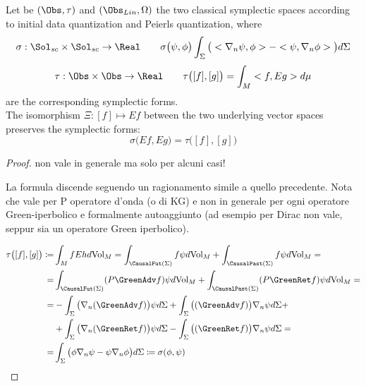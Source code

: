 \documentclass[Main]{subfiles}
\begin{document}
	\begin{proposition}
		Let be $(\Obs,\tau)$ and $(\Obs_{Lin},\Omega)$ the two classical symplectic spaces according to initial data quantization and Peierls quantization, where
		\begin{displaymath}
			\sigma: \Sol_{sc}\times \Sol_{sc} \rightarrow \Real \qquad 
			\sigma\big( \psi, \phi \big) \int_\Sigma \big( <\nabla_n \psi ,\phi>  - <\psi, \nabla_n \phi> \big) d\Sigma
		\end{displaymath}
		\begin{displaymath}
			\tau: \Obs \times \Obs \rightarrow \Real \qquad
			\tau \big( [f] ,[g] \big) = \int_M < f, Eg> d\mu
		\end{displaymath}
		are the corresponding symplectic forms.\\
		The isomorphism $\Xi: [f] \mapsto E f$ between the two underlying vector spaces preserves the symplectic forms:
		\begin{displaymath}
			\sigma \big( Ef, Eg \big) =  \tau\big( [f], [g] \big)
		\end{displaymath}
		
	
	\end{proposition}
	\begin{proof}
		\danger non vale in generale ma solo per alcuni casi!
	\begin{Warning}
		La formula discende seguendo un ragionamento simile a quello precedente. Nota che vale per P operatore d'onda (o di KG) e non in generale per ogni operatore Green-iperbolico e formalmente autoaggiunto (ad esempio per Dirac non vale, seppur sia un operatore Green iperbolico).
	\end{Warning}
		\begin{align}
		\tau\big( [f], [g] \big) \coloneqq  & \int_M f E h d\textrm{Vol}_M = 
		\int_{\CausalFut(\Sigma)} f \psi d\textrm{Vol}_M	 + \int_{\CausalPast(\Sigma)} f \psi d\textrm{Vol}_M =	\nonumber \\
		=& \int_{\CausalFut(\Sigma)} (P \GreenAdv f) \psi d\textrm{Vol}_M	 + \int_{\CausalPast(\Sigma)} ( P \GreenRet f ) \psi d\textrm{Vol}_M =	 \\
		=&  -\int_\Sigma \big( \nabla_n ( \GreenAdv f) \big) \psi d\Sigma
		+\int_\Sigma \big( ( \GreenAdv f) \big)\nabla_n  \psi d\Sigma +\\
		&+\int_\Sigma \big( \nabla_n ( \GreenRet f) \big) \psi d\Sigma  
		-\int_\Sigma \big( ( \GreenRet f) \big)\nabla_n  \psi d\Sigma =  \\
		=& \int_\Sigma \big( \phi \nabla_n \psi - \psi \nabla_n \phi \big) d\Sigma \coloneqq\sigma (\phi, \psi)
		\end{align}

	\end{proof}
\end{document}
